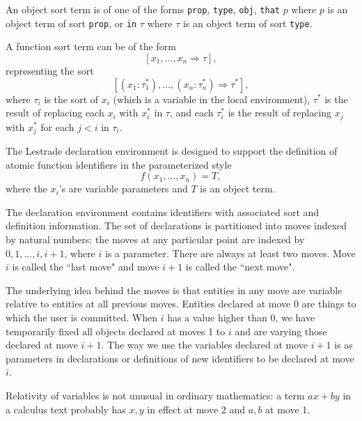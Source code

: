 \documentclass[12pt]{slides}
\begin{document}
\begin{slide}

An object sort term is of one of the forms {\tt prop}, {\tt type}, {\tt obj}, {\tt that} $p$ where $p$ is an object term of sort {\tt prop}, or {\tt in} $\tau$ where $\tau$ is an object term of sort {\tt type}.

A function sort term can be of the form $$[x_1,\ldots,x_n \Rightarrow \tau],$$representing the sort $$[(x_1:\tau_1^*),\ldots,(x_n:\tau_n^*) \Rightarrow \tau^*],$$ where $\tau_i$ is the sort of $x_i$ (which is a variable in the local environment), $\tau^*$ is the result of replacing each $x_i$ with $x_i^*$ in $\tau$,
and each $\tau_i^*$ is the result of replacing $x_j$ with $x_j^*$ for each $j<i$ in $\tau_i$.


\end{slide}

\begin{slide}

The Lestrade declaration environment is designed to support the definition of atomic function identifiers in the parameterized style $$f(x_1,\ldots,x_n) = T,$$
where the $x_i$'s are variable parameters and $T$ is an object term.

The declaration environment contains identifiers with associated sort and definition information.  The set of declarations is partitioned into moves
indexed by natural numbers:  the moves at any particular point are indexed by $0,1,\ldots,i,i+1$, where $i$ is a parameter.  There are always at least two moves.  Move $i$ is called the ``last move" and move $i+1$ is called the ``next move".

\end{slide}

\begin{slide}

The underlying idea behind the moves is that entities in any move are variable relative to entities at all previous moves.  Entities declared at move 0 are things to which the user is committed.  When $i$ has a value higher than 
0, we have temporarily fixed all objects declared at moves 1 to $i$ and are varying those declared at move $i+1$.  The way we use the variables declared at move $i+1$ is as parameters in declarations or definitions of new identifiers to be declared at
move $i$.

Relativity of variables is not unusual in ordinary mathematics:  a term $ax+by$ in a calculus text probably has $x,y$ in effect at move 2 and $a,b$ at move 1.

\end{slide}
\end{document}
